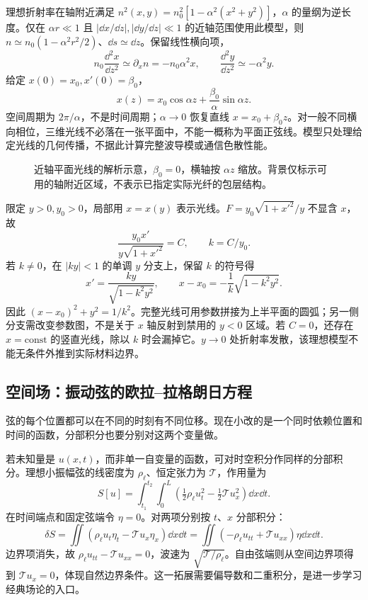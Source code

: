 \begin{example}[近轴梯度折射率模型]
理想折射率在轴附近满足 $n^2(x,y)=n_0^2[1-\alpha^2(x^2+y^2)]$，$\alpha$ 的量纲为逆长度。仅在 $\alpha r\ll1$ 且 $|\dd x/\dd z|,|\dd y/\dd z|\ll1$ 的近轴范围使用此模型，则 $n\simeq n_0(1-\alpha^2r^2/2)$、$\dd s\simeq\dd z$。保留线性横向项，
\[
n_0\frac{\dd^2x}{\dd z^2}\simeq\partial_xn=-n_0\alpha^2x,
\qquad \frac{\dd^2y}{\dd z^2}\simeq-\alpha^2y.
\]
给定 $x(0)=x_0,x'(0)=\beta_0$，
\[
x(z)=x_0\cos\alpha z+\frac{\beta_0}{\alpha}\sin\alpha z.
\]
空间周期为 $2\pi/\alpha$，不是时间周期；$\alpha\to0$ 恢复直线 $x=x_0+\beta_0z$。对一般不同横向相位，三维光线不必落在一张平面中，不能一概称为平面正弦线。模型只处理给定光线的几何传播，不据此计算完整波导模或通信色散性能。
\end{example}
\begin{figure}[htbp]
\centering
{}
\caption{近轴平面光线的解析示意，$\beta_0=0$，横轴按 $\alpha z$ 缩放。背景仅标示可用的轴附近区域，不表示已指定实际光纤的包层结构。}
\label{fig:var-grin}
\end{figure}

\begin{example}[折射率为 $n(y)=y_0/y$ 的理想介质]
限定 $y>0,y_0>0$，局部用 $x=x(y)$ 表示光线。$F=y_0\sqrt{1+x'^2}/y$ 不显含 $x$，故
\[
\frac{y_0x'}{y\sqrt{1+x'^2}}=C,\qquad k=C/y_0.
\]
若 $k\ne0$，在 $|ky|<1$ 的单调 $y$ 分支上，保留 $k$ 的符号得
\[
x'=\frac{ky}{\sqrt{1-k^2y^2}},\qquad
x-x_0=-\frac1k\sqrt{1-k^2y^2}.
\]
因此 $(x-x_0)^2+y^2=1/k^2$。完整光线可用参数拼接为上半平面的圆弧；另一侧分支需改变参数图，不是关于 $x$ 轴反射到禁用的 $y<0$ 区域。若 $C=0$，还存在 $x=\mathrm{const}$ 的竖直光线，除以 $k$ 时会漏掉它。$y\to0$ 处折射率发散，该理想模型不能无条件外推到实际材料边界。
\end{example}

\subsection{空间场：振动弦的欧拉--拉格朗日方程}
弦的每个位置都可以在不同的时刻有不同位移。现在小改的是一个同时依赖位置和时间的函数，分部积分也要分别对这两个变量做。

若未知量是 $u(x,t)$，而非单一自变量的函数，可对时空积分作同样的分部积分。理想小振幅弦的线密度为 $\rho_\ell$、恒定张力为 $\mathcal T$，作用量为
\[
S[u]=\int_{t_1}^{t_2}\int_0^L
\left(\tfrac12\rho_\ell u_t^2-\tfrac12\mathcal T u_x^2\right)\dd x\dd t.
\]
在时间端点和固定弦端令 $\eta=0$。对两项分别按 $t$、$x$ 分部积分：
\[
\delta S=\iint(\rho_\ell u_t\eta_t-\mathcal T u_x\eta_x)\dd x\dd t
=\iint(-\rho_\ell u_{tt}+\mathcal T u_{xx})\eta\dd x\dd t.
\]
边界项消失，故 $\rho_\ell u_{tt}-\mathcal T u_{xx}=0$，波速为 $\sqrt{\mathcal T/\rho_\ell}$。自由弦端则从空间边界项得到 $\mathcal T u_x=0$，体现自然边界条件。这一拓展需要偏导数和二重积分，是进一步学习经典场论的入口。

